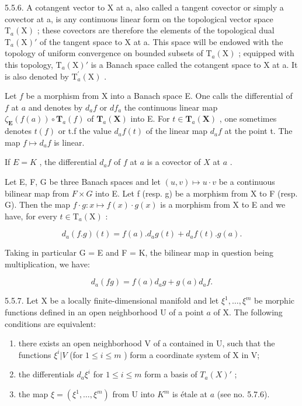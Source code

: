 5.5.6. A cotangent vector to X at a, also called a tangent covector or simply a covector at a, is any continuous linear form on the topological vector space \(\mathrm{T}_{a}(\mathrm{X})\) ; these covectors are therefore the elements of the topological dual \(\mathrm{T}_{a}(\mathrm{X})'\) of the tangent space to X at a. This space will be endowed with the topology of uniform convergence on bounded subsets of \(\mathrm{T}_{a}(\mathrm{X})\) ; equipped with this topology, \(\mathrm{T}_{a}(\mathrm{X})'\) is a Banach space called the cotangent space to X at a. It is also denoted by \(\mathrm{T}_{a}^{\prime}(\mathrm{X})\) .

Let \(f\) be a morphism from X into a Banach space E. One calls the differential of \(f\) at \(a\) and denotes by \(d_{a}f\) or \(df_{a}\) the continuous linear map \(\zeta_{\mathbf{E}}(f(a)) \circ \mathbf{T}_{a}(f)\) of \(\mathbf{T}_{a}(\mathbf{X})\) into E. For \(t \in \mathbf{T}_{a}(\mathbf{X})\) , one sometimes denotes \(t(f)\) or t.f the value \(d_{a}f(t)\) of the linear map \(d_{a}f\) at the point t. The map \(f \mapsto d_{a}f\) is linear.

If \(E = K\) , the differential \(d_a f\) of \(f\) at \(a\) is a covector of \(X\) at \(a\) .

Let E, F, G be three Banach spaces and let \((u, v) \mapsto u \cdot v\) be a continuous bilinear map from \(F \times G\) into E. Let f (resp. g) be a morphism from X to F (resp. G). Then the map \(f \cdot g : x \mapsto f(x) \cdot g(x)\) is a morphism from X to E and we have, for every \(t \in \mathrm{T}_{a}(\mathrm{X})\) :

\[
d _ {a} (f. g) (t) = f (a). d _ {a} g (t) + d _ {a} f (t). g (a).
\]

Taking in particular G = E and F = K, the bilinear map in question being multiplication, we have:

\[
d _ {a} (f g) = f (a) d _ {a} g + g (a) d _ {a} f.
\]

5.5.7. Let X be a locally finite-dimensional manifold and let \(\xi^{1},\ldots,\xi^{m}\) be morphic functions defined in an open neighborhood U of a point \(a\) of X. The following conditions are equivalent:

\begin{enumerate}
\def\labelenumi{(\roman{enumi})}
\item
  there exists an open neighborhood V of a contained in U, such that the functions \(\xi^{i}|V\) (for \(1 \leqslant i \leqslant m\) ) form a coordinate system of X in V;
\item
  the differentials \(d_a\xi^i\) for \(1 \leqslant i \leqslant m\) form a basis of \(T_a(X)'\) ;
\item
  the map \(\xi = (\xi^1, \ldots, \xi^m)\) from U into \(K^m\) is étale at \(a\) (see no. 5.7.6).
\end{enumerate}

